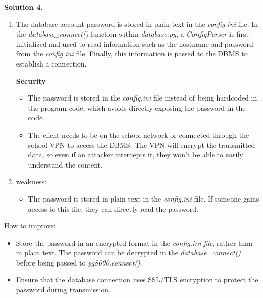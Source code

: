 \documentclass[12pt]{article}
\newcommand{\solution}[1]{\noindent \textbf{Solution #1.}}
\begin{document}
\newpage

  \solution{4}
  \begin{enumerate}
    \item The database account password is stored in plain text in the \textit{config.ini} file. In the \textit{database\_connect()} function within \textit{database.py}, a \textit{ConfigParser} is first initialized and used to read information such as the hostname and password from the \textit{config.ini} file. Finally, this information is passed to the DBMS to establish a connection.

    \textbf{Security}
    \begin{itemize}
      \item The password is stored in the \textit{config.ini} file instead of being hardcoded in the program code, which avoids directly exposing the password in the code.

      \item The client needs to be on the school network or connected through the school VPN to access the DBMS. The VPN will encrypt the transmitted data, so even if an attacker intercepts it, they won’t be able to easily understand the content.
    \end{itemize}

    \item
    weakness:
    \begin{itemize}
      \item The password is stored in plain text in the \textit{config.ini} file. If someone gains access to this file, they can directly read the password.

    \end{itemize}
  \end{enumerate}

  How to improve:
  \begin{itemize}
    \item Store the password in an encrypted format in the \textit{config.ini file}, rather than in plain text. The password can be decrypted in the \textit{database\_connect()} before being passed to \textit{pg8000.connect()}.

    \item Ensure that the database connection uses SSL/TLS encryption to protect the password during transmission.
  \end{itemize}
\end{document}
